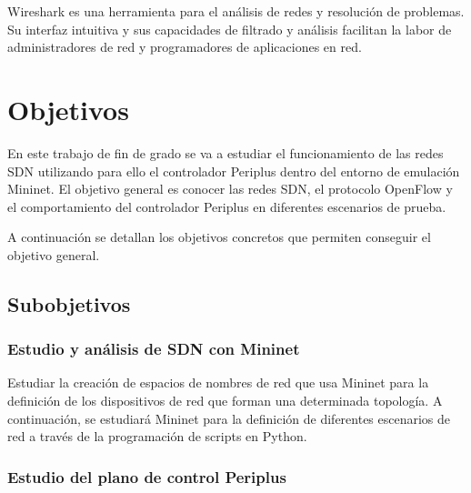 \documentclass[a4paper, 12pt]{book}
\begin{document}
	
	Wireshark es una herramienta para el análisis de redes y resolución de problemas. Su interfaz intuitiva y sus capacidades de filtrado y análisis facilitan la labor de administradores de red y programadores de aplicaciones en red.
	
	
	\cleardoublepage %
	\chapter{Objetivos} %
	\label{chap:objetivos} %
	
	En este trabajo de fin de grado se va a estudiar el funcionamiento de las redes SDN
	utilizando para ello el controlador Periplus dentro
	del entorno de emulación Mininet. El objetivo
	general es conocer las redes SDN, el protocolo
	OpenFlow y el comportamiento del controlador
	Periplus en diferentes escenarios de prueba. 
	
	A continuación se detallan los objetivos concretos que permiten conseguir el objetivo general.
	\section{Subobjetivos}
	\subsection{Estudio y análisis de SDN con Mininet} %
	\label{sec:objetivo-mininet} %
	
	Estudiar la creación de espacios de nombres de red que usa Mininet para la definición
	de los dispositivos de red que forman una determinada topología. A continuación, se estudiará Mininet para la	definición de diferentes escenarios de	red a través de la programación de scripts en Python.
		
	
	\subsection{Estudio del plano de control Periplus}
	\label{sec:objetivos-periplus}
	
\end{document}
